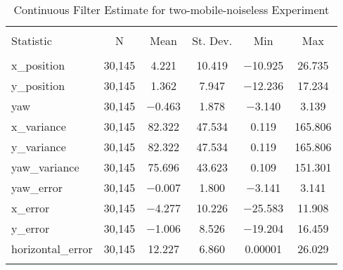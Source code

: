 
\begin{table}[h] \centering 
  \caption{Continuous Filter Estimate for two-mobile-noiseless Experiment} 
  \label{tab:two_mobile_noiseless_continuous_summary} 
\begin{tabular}{@{\extracolsep{5pt}}lccccc} 
\\[-1.8ex]\hline 
\hline \\[-1.8ex] 
Statistic & \multicolumn{1}{c}{N} & \multicolumn{1}{c}{Mean} & \multicolumn{1}{c}{St. Dev.} & \multicolumn{1}{c}{Min} & \multicolumn{1}{c}{Max} \\ 
\hline \\[-1.8ex] 
x\_position & 30,145 & \num{4.221} & \num{10.419} & $-$10.925 & \num{26.735} \\ 
y\_position & 30,145 & \num{1.362} & \num{7.947} & $-$12.236 & \num{17.234} \\ 
yaw & 30,145 & $-$0.463 & \num{1.878} & $-$3.140 & \num{3.139} \\ 
x\_variance & 30,145 & \num{82.322} & \num{47.534} & \num{0.119} & \num{165.806} \\ 
y\_variance & 30,145 & \num{82.322} & \num{47.534} & \num{0.119} & \num{165.806} \\ 
yaw\_variance & 30,145 & \num{75.696} & \num{43.623} & \num{0.109} & \num{151.301} \\ 
yaw\_error & 30,145 & $-$0.007 & \num{1.800} & $-$3.141 & \num{3.141} \\ 
x\_error & 30,145 & $-$4.277 & \num{10.226} & $-$25.583 & \num{11.908} \\ 
y\_error & 30,145 & $-$1.006 & \num{8.526} & $-$19.204 & \num{16.459} \\ 
horizontal\_error & 30,145 & \num{12.227} & \num{6.860} & \num{0.00001} & \num{26.029} \\ 
\hline \\[-1.8ex] 
\end{tabular} 
\end{table} 
